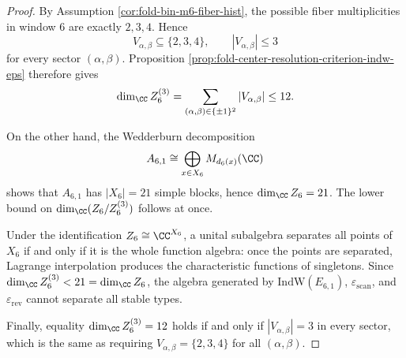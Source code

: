 \begin{proof}
By Assumption \ref{cor:fold-bin-m6-fiber-hist}, the possible fiber multiplicities in window \(6\) are exactly \(2,3,4\). Hence
\[
V_{\alpha,\beta}\subseteq\{2,3,4\},
\qquad
|V_{\alpha,\beta}|\le 3
\]
for every sector \((\alpha,\beta)\). Proposition \ref{prop:fold-center-resolution-criterion-indw-eps} therefore gives
\[
\dim_{\CC}Z_6^{(3)}
=
\sum_{(\alpha,\beta)\in\{\pm1\}^2}|V_{\alpha,\beta}|
\le 12.
\]

On the other hand, the Wedderburn decomposition
\[
A_{6,1}\cong \bigoplus_{x\in X_6}M_{d_6(x)}(\CC)
\]
shows that \(A_{6,1}\) has \(|X_6|=21\) simple blocks, hence \(\dim_{\CC}Z_6=21\). The lower bound on \(\dim_{\CC}(Z_6/Z_6^{(3)})\) follows at once.

Under the identification \(Z_6\cong \CC^{X_6}\), a unital subalgebra separates all points of \(X_6\) if and only if it is the whole function algebra: once the points are separated, Lagrange interpolation produces the characteristic functions of singletons. Since \(\dim_{\CC}Z_6^{(3)}<21=\dim_{\CC}Z_6\), the algebra generated by \(\mathrm{IndW}(E_{6,1})\), \(\varepsilon_{\mathrm{scan}}\), and \(\varepsilon_{\mathrm{rev}}\) cannot separate all stable types.

Finally, equality \(\dim_{\CC}Z_6^{(3)}=12\) holds if and only if \(|V_{\alpha,\beta}|=3\) in every sector, which is the same as requiring \(V_{\alpha,\beta}=\{2,3,4\}\) for all \((\alpha,\beta)\).
\end{proof}

\endinput
